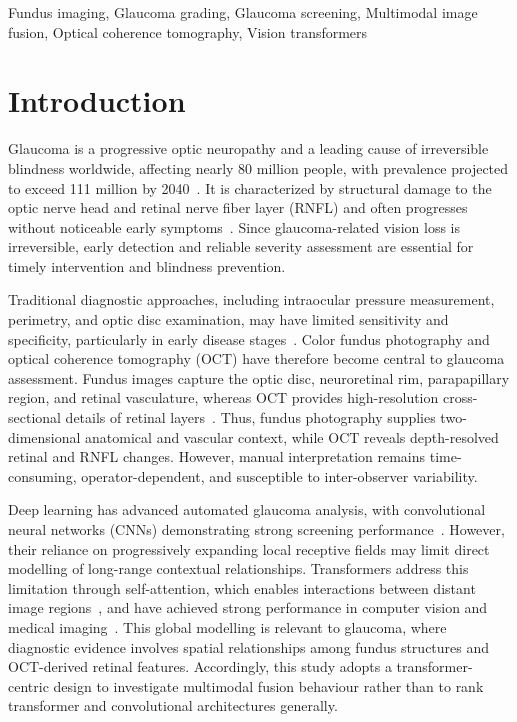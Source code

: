 \documentclass{ieeeaccess}
\begin{document}
\begin{keywords}
    Fundus imaging, Glaucoma grading, Glaucoma screening, Multimodal image fusion, Optical coherence tomography, Vision transformers
\end{keywords}

\titlepgskip=-21pt

\maketitle

\section{Introduction}
\label{sec:introduction}
Glaucoma is a progressive optic neuropathy and a leading cause of irreversible blindness worldwide, affecting nearly 80 million people, with prevalence projected to exceed 111 million by 2040~\cite{tham2014global}. It is characterized by structural damage to the optic nerve head and retinal nerve fiber layer (RNFL) and often progresses without noticeable early symptoms~\cite{mcmonnies2017glaucoma}. Since glaucoma-related vision loss is irreversible, early detection and reliable severity assessment are essential for timely intervention and blindness prevention.

Traditional diagnostic approaches, including intraocular pressure measurement, perimetry, and optic disc examination, may have limited sensitivity and specificity, particularly in early disease stages~\cite{Shan2024,jayaram2023glaucoma}. Color fundus photography and optical coherence tomography (OCT) have therefore become central to glaucoma assessment. Fundus images capture the optic disc, neuroretinal rim, parapapillary region, and retinal vasculature, whereas OCT provides high-resolution cross-sectional details of retinal layers~\cite{kanski10}. Thus, fundus photography supplies two-dimensional anatomical and vascular context, while OCT reveals depth-resolved retinal and RNFL changes. However, manual interpretation remains time-consuming, operator-dependent, and susceptible to inter-observer variability.

Deep learning has advanced automated glaucoma analysis, with convolutional neural networks (CNNs) demonstrating strong screening performance~\cite{cho2021deep,shyamalee2022attention}. However, their reliance on progressively expanding local receptive fields may limit direct modelling of long-range contextual relationships. Transformers address this limitation through self-attention, which enables interactions between distant image regions~\cite{henry2022vision}, and have achieved strong performance in computer vision and medical imaging~\cite{fan2023detecting}. This global modelling is relevant to glaucoma, where diagnostic evidence involves spatial relationships among fundus structures and OCT-derived retinal features. Accordingly, this study adopts a transformer-centric design to investigate multimodal fusion behaviour rather than to rank transformer and convolutional architectures generally.
\end{document}
